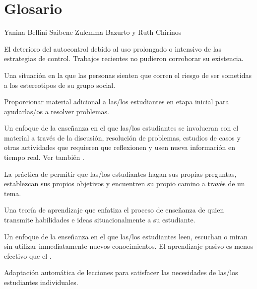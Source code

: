 \chapter{Glosario}\label{s:gloss}

\begin{reviewer}
{Yanina Bellini Saibene}
{Zulemma Bazurto y Ruth Chirinos}
\end{reviewer}

\begin{description}

 El deterioro del autocontrol debido al uso prolongado o intensivo de las estrategias de control.
Trabajos recientes no pudieron corroborar su existencia.

 Una situación en la que las personas sienten que corren el riesgo de ser sometidas a los estereotipos de su grupo social.

 Proporcionar material adicional a las/los estudiantes
en etapa inicial para ayudarlas/os a resolver problemas.

 Un enfoque de la enseñanza en el que
las/los estudiantes se involucran con el material a través de la discusión, resolución de problemas, estudios de casos
y otras actividades que requieren que reflexionen y usen nueva información en
tiempo real. Ver también .

 La práctica de permitir que 
las/los estudiantes hagan sus propias preguntas, establezcan sus propios objetivos y encuentren su propio camino a través de un tema.

 Una teoría de
aprendizaje que enfatiza el proceso de enseñanza de quien transmite habilidades e ideas
situacionalmente a su estudiante.

 Un enfoque de la enseñanza en el que las/los 
estudiantes leen, escuchan o miran sin utilizar inmediatamente nuevos conocimientos. 
El aprendizaje pasivo es menos efectivo que el .

 Adaptación automática de lecciones para 
satisfacer las necesidades de las/los estudiantes individuales.


\end{description}
